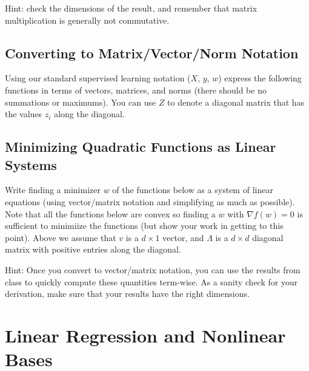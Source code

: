 \documentclass{article}
\begin{document}
Hint: check the dimensions of the result, and remember that matrix multiplication is generally not commutative.


\subsection{Converting to Matrix/Vector/Norm Notation}

Using our standard supervised learning notation ($X$, $y$, $w$)
express the following functions in terms of vectors, matrices, and norms (there should be no summations or maximums).
You can use $Z$ to denote a diagonal matrix that has the values $z_i$ along the diagonal.

\subsection{Minimizing Quadratic Functions as Linear Systems}

Write finding a minimizer $w$ of the functions below as a system of linear equations (using vector/matrix notation and simplifying as much as possible). Note that all the functions below are convex  so finding a $w$ with $\nabla f(w) = 0$ is sufficient to minimiize the functions (but show your work in getting to this point).
Above we assume that $v$ is a $d \times 1$ vector, and $\Lambda$ is a $d \times d$ diagonal matrix with positive entries along the diagonal.

Hint: Once you convert to vector/matrix notation, you can use the results from class to quickly compute these quantities term-wise. 
As a sanity check for your derivation, make sure that your results have the right dimensions.


\section{Linear Regression and Nonlinear Bases}
\end{document}
